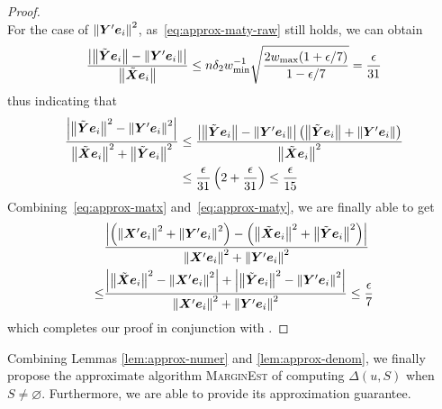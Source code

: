 \documentclass[sigconf]{acmart}
\begin{document}
\begin{proof}
\begin{equation}
    \end{equation}
    For the case of \(\Abs{\maty'\vece_i}^2\), as~\eqref{eq:approx-maty-raw} still holds, we can obtain
    \[\frac{\abs{\Abs{\tilde{\maty}\vece_i}-\Abs{\maty'\vece_i}}}{\Abs{\tilde{\matx}\vece_i}}\le n\delta_2w_{\min}^{-1}\sqrt{\frac{2w_{\max}(1+\epsilon/7)}{1-\epsilon/7}}=\frac{\epsilon}{31}\]
    thus indicating that
    \begin{equation}\label{eq:approx-maty}
        \begin{split}
            \frac{\abs{\Abs{\tilde{\maty}\vece_i}^2-\Abs{\maty'\vece_i}^2}}{\Abs{\tilde{\matx}\vece_i}^2+\Abs{\tilde{\maty}\vece_i}^2}&\le\frac{\abs{\Abs{\tilde{\maty}\vece_i}-\Abs{\maty'\vece_i}}\mypar{\Abs{\tilde{\maty}\vece_i}+\Abs{\maty'\vece_i}}}{\Abs{\tilde{\matx}\vece_i}^2}\\
            &\le\frac{\epsilon}{31}\mypar{2+\frac{\epsilon}{31}}\le\frac{\epsilon}{15}
        \end{split}
    \end{equation}
    Combining~\eqref{eq:approx-matx} and~\eqref{eq:approx-maty}, we are finally able to get
    \begin{align*}
            & \frac{\abs{\mypar{\Abs{\matx'\vece_i}^2+\Abs{\maty'\vece_i}^2}-\mypar{\Abs{\tilde{\matx}\vece_i}^2+\Abs{\tilde{\maty}\vece_i}^2}}}{\Abs{\matx'\vece_i}^2+\Abs{\maty'\vece_i}^2}            \\
        \le & \frac{\abs{\Abs{\tilde{\matx}\vece_i}^2-\Abs{\matx'\vece_i}^2}+\abs{\Abs{\tilde{\maty}\vece_i}^2-\Abs{\maty'\vece_i}^2}}{\Abs{\matx'\vece_i}^2+\Abs{\maty'\vece_i}^2}\le\frac{\epsilon}{7}
    \end{align*}
    which completes our proof in conjunction with .
\end{proof}

Combining Lemmas \ref{lem:approx-numer} and \ref{lem:approx-denom}, we finally propose the approximate algorithm \textsc{MarginEst} of computing \(\Delta(u,S)\) when \(S\neq\varnothing\). Furthermore, we are able to provide its approximation guarantee.
\end{document}
